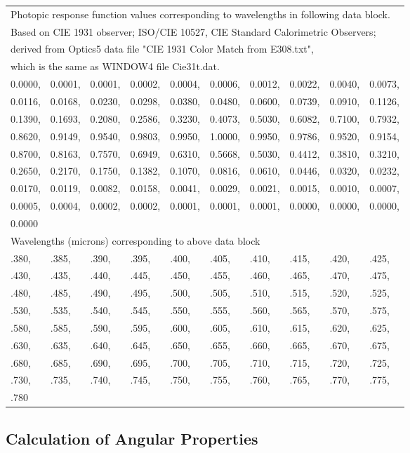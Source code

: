 \begin{longtable}[c]{p{0.5in}p{0.5in}p{0.5in}p{0.5in}p{0.5in}p{0.5in}p{0.5in}p{0.5in}p{0.5in}p{0.5in}}
\multicolumn{10}{l}{Photopic response function values corresponding to wavelengths in following data block.} \tabularnewline 
\multicolumn{10}{l}{Based on CIE 1931 observer; ISO/CIE 10527, CIE Standard Calorimetric Observers;} \tabularnewline 
\multicolumn{10}{l}{derived from Optics5 data file "CIE 1931 Color Match from E308.txt",} \tabularnewline 
\multicolumn{10}{l}{which is the same as WINDOW4 file Cie31t.dat.} \tabularnewline \midrule \endhead
0.0000, & 0.0001, & 0.0001, & 0.0002, & 0.0004, & 0.0006, & 0.0012, & 0.0022, & 0.0040, & 0.0073, \tabularnewline 
0.0116, & 0.0168, & 0.0230, & 0.0298, & 0.0380, & 0.0480, & 0.0600, & 0.0739, & 0.0910, & 0.1126, \tabularnewline 
0.1390, & 0.1693, & 0.2080, & 0.2586, & 0.3230, & 0.4073, & 0.5030, & 0.6082, & 0.7100, & 0.7932, \tabularnewline 
0.8620, & 0.9149, & 0.9540, & 0.9803, & 0.9950, & 1.0000, & 0.9950, & 0.9786, & 0.9520, & 0.9154, \tabularnewline 
0.8700, & 0.8163, & 0.7570, & 0.6949, & 0.6310, & 0.5668, & 0.5030, & 0.4412, & 0.3810, & 0.3210, \tabularnewline 
0.2650, & 0.2170, & 0.1750, & 0.1382, & 0.1070, & 0.0816, & 0.0610, & 0.0446, & 0.0320, & 0.0232, \tabularnewline 
0.0170, & 0.0119, & 0.0082, & 0.0158, & 0.0041, & 0.0029, & 0.0021, & 0.0015, & 0.0010, & 0.0007, \tabularnewline 
0.0005, & 0.0004, & 0.0002, & 0.0002, & 0.0001, & 0.0001, & 0.0001, & 0.0000, & 0.0000, & 0.0000, \tabularnewline 
0.0000 \tabularnewline \midrule
\multicolumn{10}{l}{Wavelengths (microns) corresponding to above data block} \tabularnewline \midrule
.380, & .385, & .390, & .395, & .400, & .405, & .410, & .415, & .420, & .425, \tabularnewline 
.430, & .435, & .440, & .445, & .450, & .455, & .460, & .465, & .470, & .475, \tabularnewline 
.480, & .485, & .490, & .495, & .500, & .505, & .510, & .515, & .520, & .525, \tabularnewline 
.530, & .535, & .540, & .545, & .550, & .555, & .560, & .565, & .570, & .575, \tabularnewline 
.580, & .585, & .590, & .595, & .600, & .605, & .610, & .615, & .620, & .625, \tabularnewline 
.630, & .635, & .640, & .645, & .650, & .655, & .660, & .665, & .670, & .675, \tabularnewline 
.680, & .685, & .690, & .695, & .700, & .705, & .710, & .715, & .720, & .725, \tabularnewline 
.730, & .735, & .740, & .745, & .750, & .755, & .760, & .765, & .770, & .775, \tabularnewline 
.780 \tabularnewline
\bottomrule
\end{longtable}

\subsection{Calculation of Angular Properties}\label{calculation-of-angular-properties}

